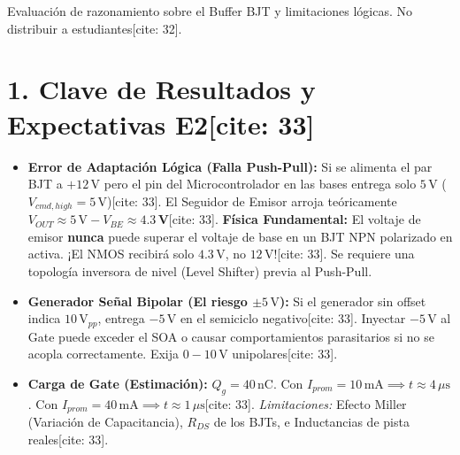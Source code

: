 \documentclass[11pt, a4paper]{article}
\begin{document}
\begin{tcolorbox}[colback=red!5, colframe=red!70!black, title=\textbf{Material Reservado Docente: Clave E2 y Microficha Formativa EC3[cite: 32]}]
    Evaluación de razonamiento sobre el Buffer BJT y limitaciones lógicas. No distribuir a estudiantes[cite: 32].
\end{tcolorbox}

\section*{1. Clave de Resultados y Expectativas E2[cite: 33]}
\begin{itemize}
    \setlength\itemsep{0.5em}
    \item \textbf{Error de Adaptación Lógica (Falla Push-Pull):} Si se alimenta el par BJT a $+12\,\text{V}$ pero el pin del Microcontrolador en las bases entrega solo $5\,\text{V}$ ($V_{cmd,high} = 5\,\text{V}$)[cite: 33].
    El Seguidor de Emisor arroja teóricamente $V_{OUT} \approx 5\,\text{V} - V_{BE} \approx \mathbf{4.3\,\text{V}}$[cite: 33].
    \textbf{Física Fundamental:} El voltaje de emisor \textbf{nunca} puede superar el voltaje de base en un BJT NPN polarizado en activa. ¡El NMOS recibirá solo $4.3\,\text{V}$, no $12\,\text{V}$![cite: 33]. Se requiere una topología inversora de nivel (Level Shifter) previa al Push-Pull.
    
    \item \textbf{Generador Señal Bipolar (El riesgo $\pm 5\,\text{V}$):} Si el generador sin offset indica $10\,\text{V}_{pp}$, entrega $-5\,\text{V}$ en el semiciclo negativo[cite: 33]. Inyectar $-5\,\text{V}$ al Gate puede exceder el SOA o causar comportamientos parasitarios si no se acopla correctamente. Exija $0-10\,\text{V}$ unipolares[cite: 33].
    
    \item \textbf{Carga de Gate (Estimación):} $Q_g = 40\,\text{nC}$. Con $I_{prom} = 10\,\text{mA} \implies t \approx 4\,\mu\text{s}$. Con $I_{prom} = 40\,\text{mA} \implies t \approx 1\,\mu\text{s}$[cite: 33]. \textit{Limitaciones:} Efecto Miller (Variación de Capacitancia), $R_{DS}$ de los BJTs, e Inductancias de pista reales[cite: 33].
\end{itemize}
\end{document}
